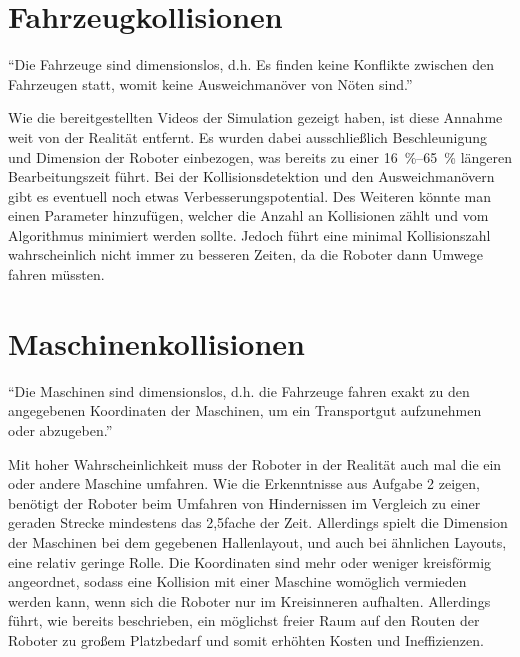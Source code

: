 \documentclass[ngerman]{tudscrreprt}
\begin{document}
\section{Fahrzeugkollisionen}
\begin{displayquote}
    ``Die Fahrzeuge sind dimensionslos, d.h. Es finden keine Konflikte zwischen den
    Fahrzeugen statt, womit keine Ausweichmanöver von Nöten sind.''
    \cite{aufgabenstellung}
\end{displayquote}
%
Wie die bereitgestellten Videos der Simulation gezeigt haben, ist diese Annahme weit von
der Realität entfernt. Es wurden dabei ausschließlich Beschleunigung und Dimension der
Roboter einbezogen, was bereits zu einer \SIrange{16}{65}{\percent} längeren
Bearbeitungszeit führt. Bei der Kollisionsdetektion und den Ausweichmanövern gibt es
eventuell noch etwas Verbesserungspotential. Des Weiteren könnte man einen Parameter
hinzufügen, welcher die Anzahl an Kollisionen zählt und vom Algorithmus minimiert werden
sollte. Jedoch führt eine minimal Kollisionszahl wahrscheinlich nicht immer zu besseren
Zeiten, da die Roboter dann Umwege fahren müssten.

\section{Maschinenkollisionen}
\begin{displayquote}
    ``Die Maschinen sind dimensionslos, d.h. die Fahrzeuge fahren exakt zu den
    angegebenen Koordinaten der Maschinen, um ein Transportgut aufzunehmen oder
    abzugeben.'' \cite{aufgabenstellung}
\end{displayquote}
%
Mit hoher Wahrscheinlichkeit muss der Roboter in der Realität auch mal die ein oder
andere Maschine umfahren. Wie die Erkenntnisse aus Aufgabe 2 zeigen, benötigt der Roboter
beim Umfahren von Hindernissen im Vergleich zu einer geraden Strecke mindestens das
2,5fache der Zeit. Allerdings spielt die Dimension der Maschinen bei dem gegebenen
Hallenlayout, und auch bei ähnlichen Layouts, eine relativ geringe Rolle. Die Koordinaten
sind mehr oder weniger kreisförmig angeordnet, sodass eine Kollision mit einer Maschine
womöglich vermieden werden kann, wenn sich die Roboter nur im Kreisinneren aufhalten.
Allerdings führt, wie bereits beschrieben, ein möglichst freier Raum auf den Routen der
Roboter zu großem Platzbedarf und somit erhöhten Kosten und Ineffizienzen.
\end{document}
